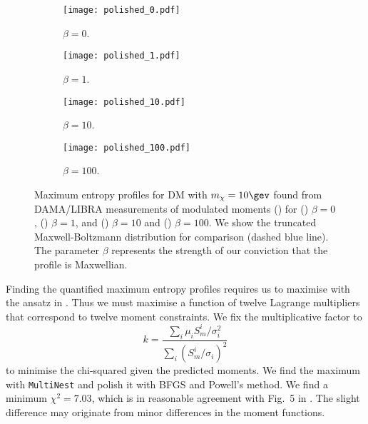 \documentclass{article}
\begin{document}
\begin{figure}
    \centering
    \begin{subfigure}[t]{0.48\textwidth}
        \centering
        \texttt{[image: polished\_0.pdf]}
        \caption{$\beta=0$.}
        \label{fig:max_ent_0}
    \end{subfigure}
    \begin{subfigure}[t]{0.48\textwidth}
        \centering
        \texttt{[image: polished\_1.pdf]}
        \caption{$\beta=1$.}
        \label{fig:max_ent_1}
    \end{subfigure}
    \begin{subfigure}[t]{0.48\textwidth}
        \centering
        \texttt{[image: polished\_10.pdf]}
        \caption{$\beta=10$.}
        \label{fig:max_ent_10}
    \end{subfigure}
    \begin{subfigure}[t]{0.48\textwidth}
        \centering
        \texttt{[image: polished\_100.pdf]}
        \caption{$\beta=100$.}
        \label{fig:max_ent_100}
    \end{subfigure}    
    \caption{Maximum entropy profiles for DM with $m_\chi = 10\gev$ found from DAMA/LIBRA measurements of modulated moments () for () $\beta=0$, () $\beta=1$, and () $\beta=10$ and () $\beta=100$. We show the truncated Maxwell-Boltzmann distribution for comparison (dashed blue line). The parameter $\beta$ represents the strength of our conviction that the profile is Maxwellian.}
    \label{fig:profiles}
\end{figure}

Finding the quantified maximum entropy profiles requires us to maximise  with the ansatz in . Thus we must maximise a function of twelve Lagrange multipliers that correspond to twelve moment constraints. We fix the multiplicative factor to
\begin{equation}
k = \frac{\sum_i \mu_i S_m^i / \sigma_i^2}{\sum_i (S_m^i / \sigma_i)^2}
\end{equation}
to minimise the chi-squared given the predicted moments. We find the maximum with \texttt{MultiNest}\cite{Feroz:2008xx} and polish it with BFGS and Powell's method\cite{doi:10.1093/comjnl/7.2.155}. We find a minimum $\chi^2=7.03$, which is in reasonable agreement with Fig.~5 in .  The slight difference may originate from minor differences in the moment functions.
\end{document}
